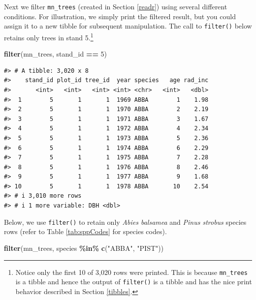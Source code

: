 \documentclass[
  11pt,
]{krantz}
\newenvironment{Shaded}{\begin{snugshade}}{\end{snugshade}}
\newcommand{\DecValTok}[1]{\textcolor[rgb]{0.00,0.00,0.81}{#1}}
\newcommand{\KeywordTok}[1]{\textcolor[rgb]{0.13,0.29,0.53}{\textbf{#1}}}
\newcommand{\NormalTok}[1]{#1}
\newcommand{\OperatorTok}[1]{\textcolor[rgb]{0.81,0.36,0.00}{\textbf{#1}}}
\newcommand{\StringTok}[1]{\textcolor[rgb]{0.31,0.60,0.02}{#1}}
\theoremstyle{definition}
\theoremstyle{definition}
\theoremstyle{definition}
\theoremstyle{definition}
\theoremstyle{remark}
\begin{document}
Next we filter \texttt{mn\_trees} (created in Section \ref{readr}) using several different conditions. For illustration, we simply print the filtered result, but you could assign it to a new tibble for subsequent manipulation. The call to \texttt{filter()} below retains only trees in stand 5.\footnote{Notice only the first 10 of 3,020 rows were printed. This is because \texttt{mn\_trees} is a tibble and hence the output of \texttt{filter()} is a tibble and has the nice print behavior described in Section \ref{tibbles}.}

\begin{Shaded}
\begin{Highlighting}[]
\KeywordTok{filter}\NormalTok{(mn\_trees, stand\_id }\OperatorTok{==}\StringTok{ }\DecValTok{5}\NormalTok{)}
\end{Highlighting}
\end{Shaded}

\begin{verbatim}
#> # A tibble: 3,020 x 8
#>    stand_id plot_id tree_id  year species   age rad_inc
#>       <int>   <int>   <int> <int> <chr>   <int>   <dbl>
#>  1        5       1       1  1969 ABBA        1    1.98
#>  2        5       1       1  1970 ABBA        2    2.19
#>  3        5       1       1  1971 ABBA        3    1.67
#>  4        5       1       1  1972 ABBA        4    2.34
#>  5        5       1       1  1973 ABBA        5    2.36
#>  6        5       1       1  1974 ABBA        6    2.29
#>  7        5       1       1  1975 ABBA        7    2.28
#>  8        5       1       1  1976 ABBA        8    2.46
#>  9        5       1       1  1977 ABBA        9    1.68
#> 10        5       1       1  1978 ABBA       10    2.54
#> # i 3,010 more rows
#> # i 1 more variable: DBH <dbl>
\end{verbatim}

Below, we use \texttt{filter()} to retain only \emph{Abies balsamea} and \emph{Pinus strobus} species rows (refer to Table \ref{tab:sppCodes} for species codes).

\begin{Shaded}
\begin{Highlighting}[]
\KeywordTok{filter}\NormalTok{(mn\_trees, species }\OperatorTok{\%in\%}\StringTok{ }\KeywordTok{c}\NormalTok{(}\StringTok{"ABBA"}\NormalTok{, }\StringTok{"PIST"}\NormalTok{))}
\end{Highlighting}
\end{Shaded}
\end{document}
